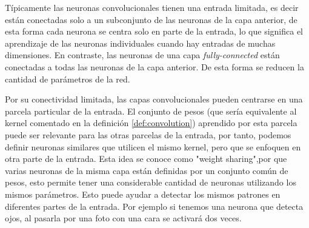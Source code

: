 \documentclass[12,twoside]{TFG-GM}
\theoremstyle{definition}
\theoremstyle{remark}
\begin{document}
Típicamente las neuronas convolucionales tienen una entrada limitada, es decir están conectadas solo a un subconjunto de las neuronas de la capa anterior, de esta forma cada neurona se centra solo en parte de la entrada, lo que significa el aprendizaje de las neuronas individuales cuando hay entradas de muchas dimensiones. En contraste, las neuronas de una capa \textit{fully-connected} están conectadas a todas las neuronas de la capa anterior. %
De esta forma se reducen la cantidad de parámetros de la red.



Por su conectividad limitada, las capas convolucionales pueden centrarse en una parcela particular de la entrada. El conjunto de pesos (que sería equivalente al kernel comentado en la definición \ref{def:convolution}) aprendido por esta parcela puede ser relevante para las otras parcelas de la entrada, por tanto, podemos definir neuronas similares que utilicen el mismo kernel, pero que se enfoquen en otra parte de la entrada. Esta idea se conoce como "weight sharing",por que varias neuronas de la misma capa están definidas por un conjunto común de pesos, esto permite tener una considerable cantidad de neuronas utilizando los mismos parámetros. Esto puede ayudar a detectar los mismos patrones en diferentes partes de la entrada. Por ejemplo si tenemos una neurona que detecta ojos, al pasarla por una foto con una cara se activará dos veces.  
\end{document}
